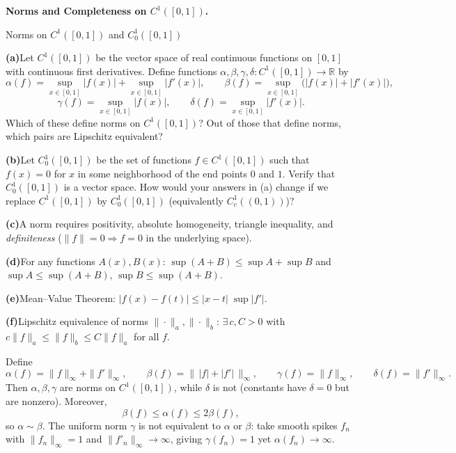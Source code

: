 \begin{problem}[CP-II-0471]
\label{prob:cp-ii-0471}
\textbf{Norms and Completeness on \(C^1([0,1])\).}

\hspace*{1.5em}Norms on $C^1([0,1])$ and $C^1_0([0,1])$

	\par\smallskip\noindent\textbf{(a)}\quad Let $C^{1}([0,1])$ be the vector space of real continuous functions on $[0,1]$ with
	continuous first derivatives. Define functions $\alpha,\beta,\gamma,\delta:C^{1}([0,1])\to\mathbb{R}$ by
	\[
	\alpha(f)=\sup_{x\in[0,1]}|f(x)|+\sup_{x\in[0,1]}|f'(x)|,\qquad
	\beta(f)=\sup_{x\in[0,1]} \big(|f(x)|+|f'(x)|\big),
	\]
	\[
	\gamma(f)=\sup_{x\in[0,1]}|f(x)|,\qquad
	\delta(f)=\sup_{x\in[0,1]}|f'(x)|.
	\]
	Which of these define norms on $C^{1}([0,1])$?
	Out of those that define norms, which pairs are Lipschitz equivalent?

	\par\smallskip\noindent\textbf{(b)}\quad Let $C^{1}_{0}([0,1])$ be the set of functions $f\in C^{1}([0,1])$ such that
	$f(x)=0$ for $x$ in some neighborhood of the end points $0$ and $1$. Verify that
	$C^{1}_{0}([0,1])$ is a vector space. How would your answers in (a) change if we replace
	$C^{1}([0,1])$ by $C^{1}_{0}([0,1])$ (equivalently $C^{1}_{c}((0,1))$)?
\par\smallskip\noindent\textbf{(c)}\quad A norm requires positivity, absolute homogeneity, triangle inequality, and
	\emph{definiteness} ($\|f\|=0\Rightarrow f=0$ in the underlying space).
	\par\smallskip\noindent\textbf{(d)}\quad For any functions $A(x),B(x)$:
	$\sup(A+B)\le \sup A+\sup B$ and $\sup A\le \sup(A+B)$, $\sup B\le \sup(A+B)$.
	\par\smallskip\noindent\textbf{(e)}\quad Mean--Value Theorem: $|f(x)-f(t)|\le |x-t|\;\sup|f'|$.
	\par\smallskip\noindent\textbf{(f)}\quad Lipschitz equivalence of norms $\|\cdot\|_a,\|\cdot\|_b$:
	$\exists\,c,C>0$ with $c\|f\|_a\le \|f\|_b\le C\|f\|_a$ for all $f$.

Define
\[
\alpha(f)=\|f\|_\infty+\|f'\|_\infty,\qquad
\beta(f)=\big\|\,|f|+|f'|\,\big\|_\infty,\qquad
\gamma(f)=\|f\|_\infty,\qquad
\delta(f)=\|f'\|_\infty.
\]
Then $\alpha,\beta,\gamma$ are norms on $C^1([0,1])$, while $\delta$ is not (constants have
$\delta=0$ but are nonzero). Moreover,
\[
\beta(f)\le \alpha(f)\le 2\beta(f),
\]
so $\alpha\sim\beta$. The uniform norm $\gamma$ is not equivalent to $\alpha$ or $\beta$:
take smooth spikes $f_n$ with $\|f_n\|_\infty=1$ and $\|f'_n\|_\infty\to\infty$, giving
$\gamma(f_n)=1$ yet $\alpha(f_n)\to\infty$.


\end{problem}
